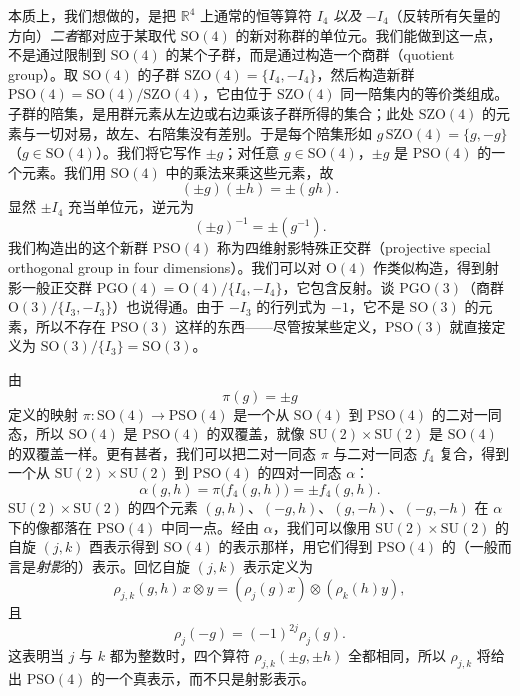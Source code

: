 本质上，我们想做的，是把 $\mathbb{R}^4$ 上通常的恒等算符 $I_4$ \emph{以及} $-I_4$（反转所有矢量的方向）\emph{二者}都对应于某取代 $\mathrm{SO}(4)$ 的新对称群的单位元。我们能做到这一点，不是通过限制到 $\mathrm{SO}(4)$ 的某个子群，而是通过构造一个商群（quotient group）。取 $\mathrm{SO}(4)$ 的子群 $\mathrm{SZO}(4)=\{I_4,-I_4\}$，然后构造新群 $\mathrm{PSO}(4)=\mathrm{SO}(4)/\mathrm{SZO}(4)$，它由位于 $\mathrm{SZO}(4)$ 同一陪集内的等价类组成。子群的陪集，是用群元素从左边或右边乘该子群所得的集合；此处 $\mathrm{SZO}(4)$ 的元素与一切对易，故左、右陪集没有差别。于是每个陪集形如 $g\,\mathrm{SZO}(4)=\{g,-g\}$（$g\in\mathrm{SO}(4)$）。我们将它写作 $\pm g$；对任意 $g\in\mathrm{SO}(4)$，$\pm g$ 是 $\mathrm{PSO}(4)$ 的一个元素。我们用 $\mathrm{SO}(4)$ 中的乘法来乘这些元素，故
\[
(\pm g)(\pm h)=\pm(gh).
\]
显然 $\pm I_4$ 充当单位元，逆元为
\[
(\pm g)^{-1}=\pm(g^{-1}).
\]
我们构造出的这个新群 $\mathrm{PSO}(4)$ 称为四维射影特殊正交群（projective special orthogonal group in four dimensions）。我们可以对 $\mathrm{O}(4)$ 作类似构造，得到射影一般正交群 $\mathrm{PGO}(4)=\mathrm{O}(4)/\{I_4,-I_4\}$，它包含反射。谈 $\mathrm{PGO}(3)$（商群 $\mathrm{O}(3)/\{I_3,-I_3\}$）也说得通。由于 $-I_3$ 的行列式为 $-1$，它不是 $\mathrm{SO}(3)$ 的元素，所以不存在 $\mathrm{PSO}(3)$ 这样的东西——尽管按某些定义，$\mathrm{PSO}(3)$ 就直接定义为 $\mathrm{SO}(3)/\{I_3\}=\mathrm{SO}(3)$。

由
\[
\pi(g)=\pm g
\]
定义的映射 $\pi:\mathrm{SO}(4)\to\mathrm{PSO}(4)$ 是一个从 $\mathrm{SO}(4)$ 到 $\mathrm{PSO}(4)$ 的二对一同态，所以 $\mathrm{SO}(4)$ 是 $\mathrm{PSO}(4)$ 的双覆盖，就像 $\mathrm{SU}(2)\times\mathrm{SU}(2)$ 是 $\mathrm{SO}(4)$ 的双覆盖一样。更有甚者，我们可以把二对一同态 $\pi$ 与二对一同态 $f_4$ 复合，得到一个从 $\mathrm{SU}(2)\times\mathrm{SU}(2)$ 到 $\mathrm{PSO}(4)$ 的四对一同态 $\alpha$：
\[
\alpha(g,h)=\pi\big(f_4(g,h)\big)=\pm f_4(g,h).
\]
$\mathrm{SU}(2)\times\mathrm{SU}(2)$ 的四个元素 $(g,h)$、$(-g,h)$、$(g,-h)$、$(-g,-h)$ 在 $\alpha$ 下的像都落在 $\mathrm{PSO}(4)$ 中同一点。经由 $\alpha$，我们可以像用 $\mathrm{SU}(2)\times\mathrm{SU}(2)$ 的自旋 $(j,k)$ 酉表示得到 $\mathrm{SO}(4)$ 的表示那样，用它们得到 $\mathrm{PSO}(4)$ 的（一般而言是\emph{射影}的）表示。回忆自旋 $(j,k)$ 表示定义为
\[
\rho_{j,k}(g,h)\,x\otimes y=(\rho_j(g)x)\otimes(\rho_k(h)y),
\]
且
\[
\rho_j(-g)=(-1)^{2j}\rho_j(g).
\]
这表明当 $j$ 与 $k$ 都为整数时，四个算符 $\rho_{j,k}(\pm g,\pm h)$ 全都相同，所以 $\rho_{j,k}$ 将给出 $\mathrm{PSO}(4)$ 的一个真表示，而不只是射影表示。
